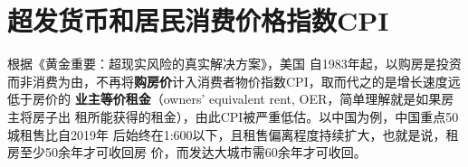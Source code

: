 
\section{超发货币和居民消费价格指数CPI}

根据《黄金重要：超现实风险的真实解决方案》\cite{piepenburg2022gold}，美国
自1983年起，以购房是投资而非消费为由，不再将\textbf{购房价}计入消费者物价指数CPI，取而代之的是增长速度远低于房价的%
\textbf{业主等价租金}（owners’ equivalent rent, OER，简单理解就是如果房主将房子出
租所能获得的租金），由此CPI被严重低估。以中国为例，中国重点50城租售比自2019年
后始终在1:600以下，且租售偏离程度持续扩大，也就是说，租房至少50余年才可收回房
价，而发达大城市需60余年才可收回。


